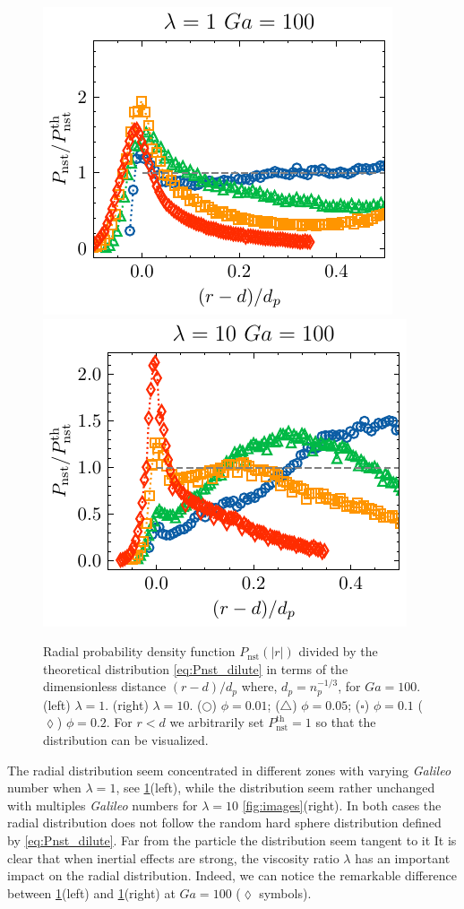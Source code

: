 \begin{figure}[h!]
    \centering
    \includegraphics[height=0.3\textwidth]{image/HOMOGENEOUS_NEW/Dist/Pr_l_1_Ga_100.pdf}
    \includegraphics[height=0.3\textwidth]{image/HOMOGENEOUS_NEW/Dist/Pr_l_10_Ga_100.pdf}
    \caption{Radial probability density function $P_\text{nst}(|r|)$ divided by the theoretical distribution \ref{eq:Pnst_dilute} in terms of the dimensionless distance $(r-d)/d_p$ where, $d_p = n_p^{-1/3}$, for  $Ga = 100$.
    (left)  $\lambda = 1$.
    (right) $\lambda = 10$.
    ($\pmb\bigcirc$) $\phi = 0.01$; ($\pmb\triangle$) $ \phi = 0.05$; ($\pmb\square$) $\phi = 0.1$ ($\pmb\lozenge$) $\phi = 0.2$.
    For $r<d$ we arbitrarily set $P_\text{nst}^\text{th} = 1$ so that the distribution can be visualized.
    }
    \label{fig:Pr}
\end{figure}
The radial distribution seem concentrated in different zones with varying \textit{Galileo} number when $\lambda = 1$, see \ref{fig:Pr}(left), while the distribution seem rather unchanged with multiples \textit{Galileo} numbers for $\lambda = 10$ \ref{fig:images}(right). 
In both cases the radial distribution does not follow the random hard sphere distribution defined by \ref{eq:Pnst_dilute}. 
Far from the particle the distribution seem tangent to it 
It is clear that when inertial effects are strong, the viscosity ratio $\lambda$ has an important impact on the radial distribution. 
Indeed, we can notice the remarkable difference between \ref{fig:Pr}(left) and  \ref{fig:Pr}(right) at $Ga = 100$ ($\lozenge$ symbols). 
